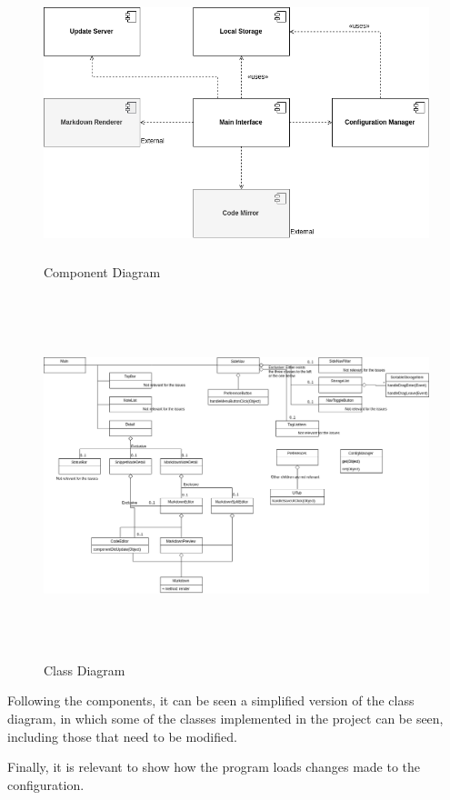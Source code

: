 \begin{figure}
\centering
\includegraphics[height=3.12500in]{../ComponentDiagram.png}
\caption{Component Diagram}
\end{figure}

\begin{figure}
\centering
\includegraphics[height=4.16667in]{../ClassDiagram.png}
\caption{Class Diagram}
\end{figure}

Following the components, it can be seen a simplified version of the
class diagram, in which some of the classes implemented in the project
can be seen, including those that need to be modified.

Finally, it is relevant to show how the program loads changes made to
the configuration.


